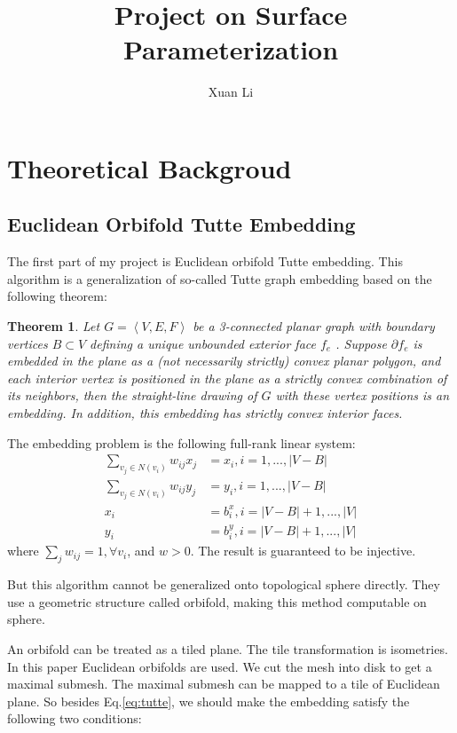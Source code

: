 \documentclass[fleqn,10pt]{wlscirep}
\title{Project on Surface Parameterization}
\author[1,*]{Xuan Li}
\affil[1]{Department of Computer Science, Stony Brook University}
\affil[*]{SBU ID: 111676019}
\newtheorem{theorem}{Theorem}[section]
\begin{document}
\flushbottom
\maketitle
%
%
\section{Theoretical Backgroud}
\subsection{Euclidean Orbifold Tutte Embedding}
The first part of my project is Euclidean orbifold Tutte embedding\cite{Aigerman:2015:OTE:2816795.2818099}. This algorithm is a generalization of so-called Tutte graph embedding based on the following theorem:
\begin{theorem}\label{tutte-theorem}
Let $G = \left<V , E , F \right>$ be a 3-connected planar graph with boundary vertices $B \subset V$ defining a unique unbounded exterior face $f_e$ . Suppose $\partial f_e$ is embedded in the plane as a (not necessarily strictly) convex planar polygon, and each interior vertex is positioned in the plane as a strictly convex combination of its neighbors, then the straight-line drawing of $G$ with these vertex positions is an embedding. In addition, this embedding has strictly convex interior faces.
\end{theorem}
The embedding problem is the following full-rank linear system:
\begin{equation}
\begin{split}
\sum_{v_j \in \mathit{N}(v_i)} w_{ij}x_j &= x_i, i = 1, ..., |V - B|\\
\sum_{v_j \in \mathit{N}(v_i)} w_{ij}y_j &= y_i, i = 1, ..., |V - B|\\
x_i &= b_i^x, i = |V-B| + 1, ... , |V|\\
y_i &= b_i^y, i = |V-B| + 1, ... , |V|
\end{split}
\label{eq:tutte}
\end{equation}
where $\sum_{j}w_{ij} = 1, \forall v_i$, and $w > 0$.
The result is guaranteed to be injective.

But this algorithm cannot be generalized onto topological sphere directly.
They \cite{Aigerman:2015:OTE:2816795.2818099} use a geometric structure called orbifold, making this method computable on sphere.

An orbifold can be treated as a tiled plane. The tile transformation is isometries. In this paper Euclidean orbifolds are used. We cut the mesh into disk to get a maximal submesh. The maximal submesh can be mapped to a tile of Euclidean plane. So besides Eq.\ref{eq:tutte}, we should make the embedding satisfy the following two conditions:
\end{document}
